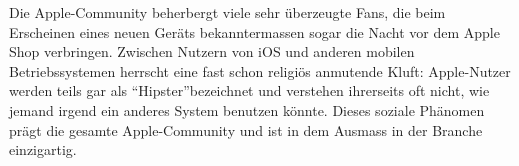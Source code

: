 Die \mbox{Apple-Community} beherbergt viele sehr überzeugte Fans, die beim Erscheinen eines neuen Geräts bekanntermassen sogar die Nacht vor dem Apple Shop verbringen. Zwischen Nutzern von iOS und anderen mobilen Betriebssystemen herrscht eine fast schon religiös anmutende Kluft: \mbox{Apple-Nutzer} werden teils gar als ``Hipster''bezeichnet\thinspace\cite{online:ios-hipster} und verstehen ihrerseits oft nicht, wie jemand irgend ein anderes System benutzen könnte. Dieses soziale Phänomen prägt die gesamte Apple-Community und ist in dem Ausmass in der Branche einzigartig.